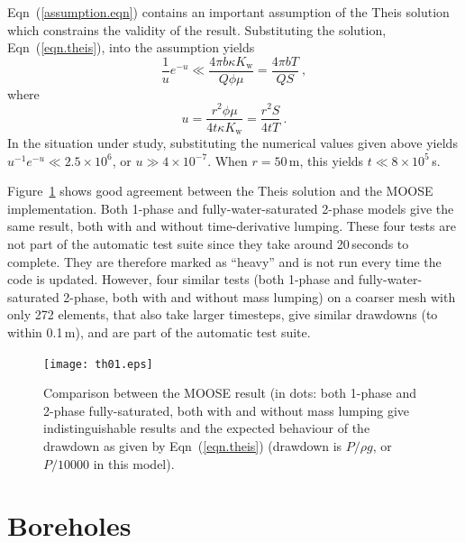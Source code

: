 \documentclass[]{scrreprt}
\begin{document}
Eqn~(\ref{assumption.eqn}) contains an important assumption of the
Theis solution which constrains the validity of the result.
Substituting the solution, Eqn~(\ref{eqn.theis}), into the assumption
yields
\begin{equation} 
\frac{1}{u} e^{-u} \ll \frac{4 \pi b \kappa K_{\mathrm{w}}}{Q\phi\mu}
= \frac{4\pi b T}{QS} \ ,
\end{equation}
where
\begin{equation}
u = \frac{r^{2}\phi\mu}{4t\kappa K_{\mathrm{w}}} = \frac{r^{2}S}{4tT}
\ .
\end{equation}
In the situation under study, substituting the numerical values given
above yields $u^{-1}e^{-u} \ll 2.5\times 10^{6}$, or $u\gg 4\times
10^{-7}$.  When $r=50$\,m, this yields $t\ll 8\times 10^{5}$\,s.

Figure~\ref{th01.fig} shows good agreement between the Theis solution
and the MOOSE implementation.  Both 1-phase and fully-water-saturated
2-phase models give the same result, both with and without
time-derivative lumping.  These four tests are not part of the
automatic test suite since they take around 20\,seconds to complete.
They are therefore marked as ``heavy'' and is not run every time the
code is updated.  However, four similar tests (both 1-phase and
fully-water-saturated 2-phase, both with and without mass lumping) on
a coarser mesh with only 272 elements, that also take larger
timesteps, give similar drawdowns (to within 0.1\,m), and are part of
the automatic test suite.

\begin{figure}[htb]
\centering
\texttt{[image: th01.eps]}
\caption{Comparison between the MOOSE result (in dots: both 1-phase
  and 2-phase fully-saturated, both with and without mass lumping give
  indistinguishable results and the
  expected behaviour of the drawdown as given by Eqn~(\ref{eqn.theis})
  (drawdown is $P/\rho g$, or $P/10000$ in this model).}
\label{th01.fig}
\end{figure}


\chapter{Boreholes}
\label{bh}
\end{document}
